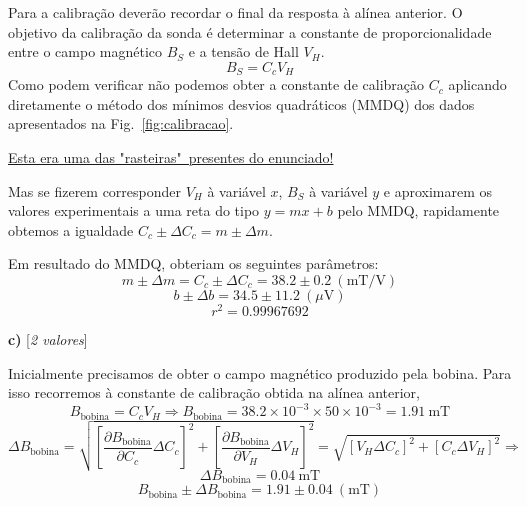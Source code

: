 \documentclass[11pt,a4paper,final]{article}
\begin{document}
Para a calibra\c{c}\~{a}o dever\~{a}o recordar o final da resposta \`{a} al\'{i}nea anterior. O objetivo da calibra\c{c}\~{a}o da sonda \'{e} determinar a constante de proporcionalidade entre o campo magn\'{e}tico $B_S$ e a tens\~{a}o de Hall $V_H$.
\begin{equation*}
B_S=C_cV_H
\end{equation*}
Como podem verificar n\~{a}o podemos obter a constante de calibração $C_c$ aplicando diretamente o m\'{e}todo dos m\'{i}nimos desvios quadr\'{a}ticos (MMDQ) dos dados apresentados na Fig.~\ref{fig:calibracao}.

\underline{Esta era uma das "rasteiras"~presentes do enunciado!}

Mas se fizerem corresponder $V_H$ \`{a} vari\'{a}vel $x$, $B_S$ \`{a} vari\'{a}vel $y$ e aproximarem os valores experimentais a uma reta do tipo $y=mx+b$ pelo MMDQ, rapidamente obtemos a igualdade $C_c \pm \Delta C_c = m \pm \Delta m$.

Em resultado do MMDQ, obteriam os seguintes par\^{a}metros:
\begin{equation*}
m \pm \Delta m = \boxed{C_c \pm \Delta C_c = 38.2 \pm 0.2~(\text{mT/V})}
\end{equation*}
\begin{equation*}
b \pm \Delta b = 34.5 \pm 11.2~(\mu\text{V})
\end{equation*}
\begin{equation*}
r^2 = 0.99967692
\end{equation*}

\textbf{c)} \hfill [\textit{2 valores}]

Inicialmente precisamos de obter o campo magn\'{e}tico produzido pela bobina. Para isso recorremos \`{a} constante de calibra\c{c}\~{a}o obtida na al\'{i}nea anterior,
\begin{equation*}
B_\text{bobina}=C_cV_H \Rightarrow B_\text{bobina}=38.2\times10^{-3}\times50\times10^{-3}=1.91~\text{mT}
\end{equation*}
\begin{equation*}
\Delta B_\text{bobina}=\sqrt{\left[\frac{\partial B_\text{bobina}}{\partial C_c}\Delta C_c\right]^2+\left[\frac{\partial B_\text{bobina}}{\partial V_H}\Delta V_H\right]^2} = \sqrt{\left[V_H \Delta C_c\right]^2+\left[C_c\Delta V_H\right]^2} \Rightarrow
\end{equation*}
\begin{equation*}
\Delta B_\text{bobina}=0.04~\text{mT}
\end{equation*}
\begin{equation*}
\boxed{B_\text{bobina} \pm \Delta B_\text{bobina} =1.91 \pm 0.04~(\text{mT})}
\end{equation*}
\end{document}
